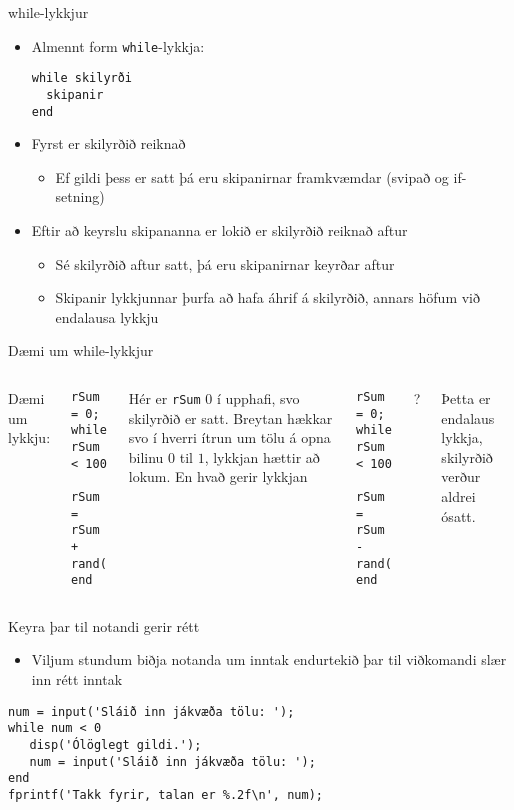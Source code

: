 \documentclass{beamer}
\begin{document}
\begin{frame}[fragile]{while-lykkjur}
\begin{itemize}
 \item Almennt form \texttt{while}-lykkja:
\begin{verbatim}
while skilyrði
  skipanir
end
\end{verbatim}
\pause
 \item Fyrst er skilyrðið reiknað
 \begin{itemize}
  \item Ef gildi þess er satt þá eru skipanirnar framkvæmdar (svipað og if-setning)
 \end{itemize}
 \item Eftir að keyrslu skipananna er lokið er skilyrðið reiknað aftur
 \begin{itemize}
  \item Sé skilyrðið aftur satt, þá eru skipanirnar keyrðar aftur
  \item Skipanir lykkjunnar þurfa að hafa áhrif á skilyrðið, annars höfum við endalausa lykkju
 \end{itemize}
\end{itemize}
\end{frame}

\begin{frame}[fragile]{Dæmi um while-lykkjur}
\begin{columns}
\vspace{0.8cm}

Dæmi um lykkju:
\begin{verbatim}
rSum = 0;
while rSum < 100
   rSum = rSum + rand();
end
\end{verbatim}
Hér er \texttt{rSum} $0$ í upphafi, svo skilyrðið er satt. Breytan hækkar svo í hverri ítrun um tölu á opna bilinu $0$ til $1$, lykkjan hættir að lokum.\pause
{}
En hvað gerir lykkjan
\begin{verbatim}
rSum = 0;
while rSum < 100
   rSum = rSum - rand();
end
\end{verbatim}
?
\pause

Þetta er endalaus lykkja, skilyrðið verður aldrei ósatt.
\end{columns}
\end{frame}

\begin{frame}[fragile]{Keyra þar til notandi gerir rétt}
\begin{itemize}
 \item Viljum stundum biðja notanda um inntak endurtekið þar til viðkomandi slær inn rétt inntak
\end{itemize}
\begin{verbatim}
num = input('Sláið inn jákvæða tölu: ');
while num < 0
   disp('Ólöglegt gildi.');
   num = input('Sláið inn jákvæða tölu: ');
end
fprintf('Takk fyrir, talan er %.2f\n', num);
\end{verbatim}

\end{frame}
\end{document}
